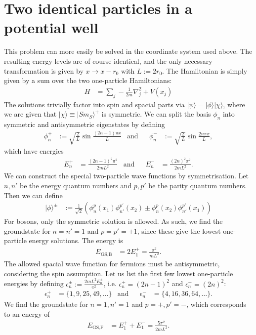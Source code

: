 \documentclass[english, parskip=full]{scrartcl}
\newcommand{\kla}{}
\newcommand{\tecxt}{}
\newcommand{\Ket}{}
\begin{document}
\section{Two identical particles in a potential well}
This problem can more easily be solved in the coordinate system used above.
The resulting energy levels are of course identical, and the only necessary transformation is given by $x\rightarrow x-r_0$ with $L:=2r_0$.
The Hamiltonian is simply given by a sum over the two one-particle Hamiltonians:
\begin{align*}
H&=\sum_j -\frac{1}{2m}\nabla_j^2+V(x_j)
\end{align*}
The solutions trivially factor into spin and spacial parts via $\Ket | {\psi} \rangle=\Ket | {\phi} \rangle\Ket | {\chi} \rangle$, where we are given that $\Ket | {\chi} \rangle\equiv\Ket | {Sm_S} \rangle^+$ is symmetric.
We can split the basis $\phi_n$ into symmetric and antisymmetric eigenstates by defining 
\begin{align*}
\phi_n^+&:=\sqrt{\frac{2}{L}}\sin\frac{(2n-1)\pi x}{L}&\tecxt\text{and}&&\phi_n^-&:=\sqrt{\frac{2}{L}}\sin\frac{2n\pi x}{L},
\end{align*}
which have energies 
\begin{align*}
E_n^+&=\frac{(2n-1)^2\pi^2}{2mL^2}&\tecxt\text{and}&&E_n^-&=\frac{(2n)^2\pi^2}{2mL^2}.
\end{align*}
We can construct the special two-particle wave functions by symmetrisation.
Let $n,n'$ be the energy quantum numbers and $p,p'$ be the parity quantum numbers. 
Then we can define
\begin{align*}
\Ket | {\phi} \rangle^\pm &:=\frac{1}{\sqrt{2}}\kla\left( {\phi_n^p(x_1)\phi_{n'}^{p'}(x_2)\pm \phi_n^p(x_2)\phi_{n'}^{p'}(x_1)} \right)
\end{align*}
For bosons, only the symmetric solution is allowed. 
As such, we find the groundstate for $n=n'=1$ and $p=p'=+1$, since these give the lowest one-particle energy solutions.
The energy is
\begin{align*}
E_\tecxt\text{GS,B}&=2E_1^+=\frac{\pi^2}{mL^2}.
\end{align*}
The allowed spacial wave function for fermions must be antisymmetric, considering the spin assumption.
Let us list the first few lowest one-particle energies by defining $\epsilon_n^\pm:=\frac{2mL^2E_n^\pm}{\pi^2}$, i.e. $\epsilon_n^+=(2n-1)^2$ and $\epsilon_n^-=(2n)^2$:
\begin{align*}
\epsilon_n^+&=\{1,9,25,49,\dots\}&\tecxt\text{and}&&\epsilon_n^-&=\{4,16,36,64,\dots\}.
\end{align*}
We find the groundstate for $n=1,n'=1$ and $p=+,p'=-$, which corresponds to an energy of
\begin{align*}
E_\tecxt\text{GS,F}&=E_1^+ + E_1^- =\frac{5\pi^2}{2mL^2}.
\end{align*}
\end{document}
